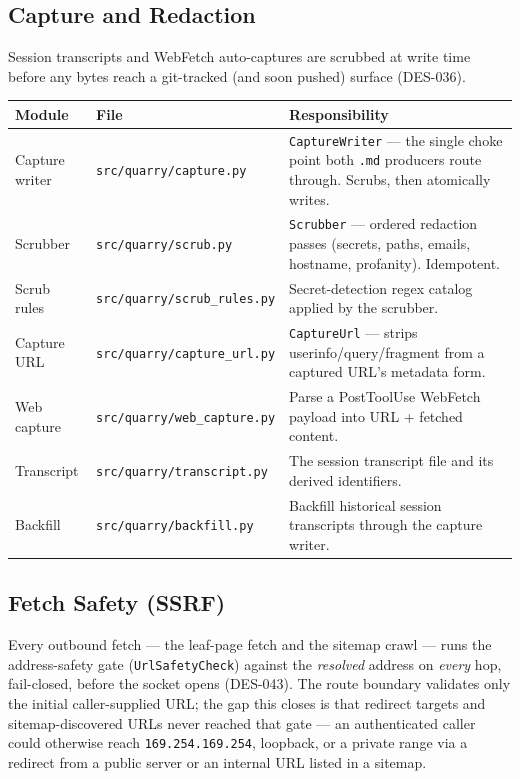 \documentclass[a4paper,10pt]{article}
\newcommand{\modpath}[1]{\texttt{src/quarry/#1}}
\begin{document}
\subsection{Capture and Redaction}

Session transcripts and WebFetch auto-captures are scrubbed at write
time before any bytes reach a git-tracked (and soon pushed) surface
(DES-036).

\begin{center}
\begin{tabular}{llp{7cm}}
\toprule
\textbf{Module} & \textbf{File} & \textbf{Responsibility} \\
\midrule
Capture writer & \modpath{capture.py}       & \texttt{CaptureWriter} ---
                 the single choke point both \texttt{.md} producers
                 route through.  Scrubs, then atomically writes. \\
Scrubber       & \modpath{scrub.py}         & \texttt{Scrubber} ---
                 ordered redaction passes (secrets, paths, emails,
                 hostname, profanity).  Idempotent. \\
Scrub rules    & \modpath{scrub\_rules.py}  & Secret-detection regex
                 catalog applied by the scrubber. \\
Capture URL    & \modpath{capture\_url.py}  & \texttt{CaptureUrl} ---
                 strips userinfo/query/fragment from a captured URL's
                 metadata form. \\
Web capture    & \modpath{web\_capture.py}  & Parse a PostToolUse
                 WebFetch payload into URL + fetched content. \\
Transcript     & \modpath{transcript.py}    & The session transcript
                 file and its derived identifiers. \\
Backfill       & \modpath{backfill.py}      & Backfill historical
                 session transcripts through the capture writer. \\
\bottomrule
\end{tabular}
\end{center}

\subsection{Fetch Safety (SSRF)}

Every outbound fetch --- the leaf-page fetch and the sitemap crawl ---
runs the address-safety gate (\texttt{UrlSafetyCheck}) against the
\emph{resolved} address on \emph{every} hop, fail-closed, before the
socket opens (DES-043).  The route boundary validates only the initial
caller-supplied URL; the gap this closes is that redirect targets and
sitemap-discovered URLs never reached that gate --- an authenticated
caller could otherwise reach \texttt{169.254.169.254}, loopback, or a
private range via a redirect from a public server or an internal URL
listed in a sitemap.
\end{document}
